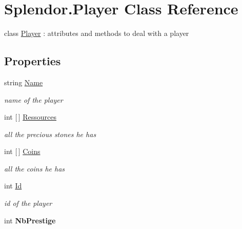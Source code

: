 \hypertarget{class_splendor_1_1_player}{}\section{Splendor.\+Player Class Reference}
\label{class_splendor_1_1_player}


class \mbox{\hyperlink{class_splendor_1_1_player}{Player}} \+: attributes and methods to deal with a player  


\subsection*{Properties}
\begin{DoxyCompactItemize}
\item 
string \mbox{\hyperlink{class_splendor_1_1_player_a15abd489e523e11b6beb4b186783e47f}{Name}}
\begin{DoxyCompactList}\small\item\em name of the player \end{DoxyCompactList}\item 
int \mbox{[}$\,$\mbox{]} \mbox{\hyperlink{class_splendor_1_1_player_a1c5ccd2470e3bbc84e9a156bc323bfd0}{Ressources}}
\begin{DoxyCompactList}\small\item\em all the precious stones he has \end{DoxyCompactList}\item 
int \mbox{[}$\,$\mbox{]} \mbox{\hyperlink{class_splendor_1_1_player_a729fa09f28e378e7934f3ae54ea463e9}{Coins}}
\begin{DoxyCompactList}\small\item\em all the coins he has \end{DoxyCompactList}\item 
int \mbox{\hyperlink{class_splendor_1_1_player_a5616e3562be3e8800f9e959e7cf75194}{Id}}
\begin{DoxyCompactList}\small\item\em id of the player \end{DoxyCompactList}\item 
\mbox{\label{class_splendor_1_1_player_ad92459d327fa7cc546259931af417aa1}} 
int {\bfseries Nb\+Prestige}
\end{DoxyCompactItemize}



